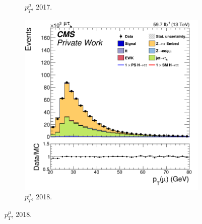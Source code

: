 \begin{figure}
\begin{subfigure}[b]{0.33\linewidth}
    \caption{$p^{\mu}_T$, 2017.} 
    \vspace{0.5ex}
  \end{subfigure} 
    \begin{subfigure}[b]{0.33\linewidth}
    \centering
    \includegraphics[width=\linewidth]{Chapitre7/Images/CtrlPlots/2018/MuonpT.png} 
    \caption{$p^{\mu}_T$, 2018.} 
    \vspace{0.5ex}
  \end{subfigure} 


\end{figure}
